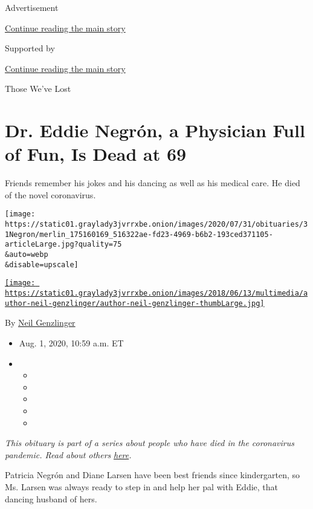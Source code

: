 Advertisement

\protect\hyperlink{after-top}{Continue reading the main story}

Supported by

\protect\hyperlink{after-sponsor}{Continue reading the main story}

Those We've Lost

\hypertarget{dr-eddie-negruxf3n-a-physician-full-of-fun-is-dead-at-69}{%
\section{Dr. Eddie Negrón, a Physician Full of Fun, Is Dead at
69}\label{dr-eddie-negruxf3n-a-physician-full-of-fun-is-dead-at-69}}

Friends remember his jokes and his dancing as well as his medical care.
He died of the novel coronavirus.

\texttt{[image: https://static01.graylady3jvrrxbe.onion/images/2020/07/31/obituaries/31Negron/merlin\_175160169\_516322ae-fd23-4969-b6b2-193ced371105-articleLarge.jpg?quality=75\\\&auto=webp\\\&disable=upscale]}

\href{https://www.nytimes3xbfgragh.onion/by/neil-genzlinger}{\texttt{[image: https://static01.graylady3jvrrxbe.onion/images/2018/06/13/multimedia/author-neil-genzlinger/author-neil-genzlinger-thumbLarge.jpg]}}

By \href{https://www.nytimes3xbfgragh.onion/by/neil-genzlinger}{Neil
Genzlinger}

\begin{itemize}
\item
  Aug. 1, 2020, 10:59 a.m. ET
\item
  \begin{itemize}
  \item
  \item
  \item
  \item
  \item
  \end{itemize}
\end{itemize}

\emph{This obituary is part of a series about people who have died in
the coronavirus pandemic. Read about others}
\href{https://www.nytimes3xbfgragh.onion/interactive/2020/obituaries/people-died-coronavirus-obituaries.html}{\emph{here}}\emph{.}

Patricia Negrón and Diane Larsen have been best friends since
kindergarten, so Ms. Larsen was always ready to step in and help her pal
with Eddie, that dancing husband of hers.


